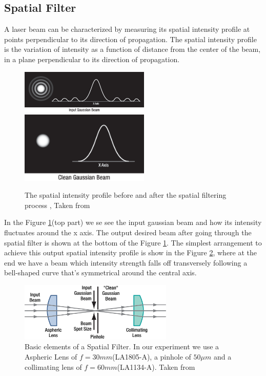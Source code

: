 \subsection{Spatial Filter}
A laser beam can be characterized by measuring its spatial intensity profile at points perpendicular to its direction of propagation. 
The spatial intensity profile is the variation of intensity as a function of distance from the center of the beam, in a plane perpendicular to its direction of propagation.
\begin{figure}[h!]
\centering
{  \includegraphics[width=0.55\textwidth]{Figures/inputBeam.png} }
{  \includegraphics[width=0.55\textwidth]{Figures/outputBeam.png} }
\caption{The spatial intensity profile before and after the spatial filtering process , Taken from \cite{thorlabs}}
 \label{fig:inputOutputBeam}
\end{figure}
In the Figure \ref{fig:inputOutputBeam}(top part) we se see the input gaussian beam 
and how its intensity fluctuates around the x axis. The output desired beam after going through the spatial filter is shown at the bottom 
of the Figure \ref{fig:inputOutputBeam}.
The simplest arrangement to achieve this output spatial intensity profile is show in the Figure \ref{fig:spatialFilter}, 
where at the end we have a beam which intensity strength falls off transversely following a bell-shaped curve that's symmetrical around the central axis.
\begin{figure}[h!]
\centering
\includegraphics[width=0.65\textwidth]{Figures/spatialFilter.png}
\caption{Basic elements of a Spatial Filter. In our experiment we use a Aspheric Lens of $f=30 mm$(LA1805-A), a pinhole of $50 \mu m$ and a collimating lens of $f=60 mm$(LA1134-A). Taken from \cite{thorlabs}} 
\label{fig:spatialFilter}
\end{figure}
